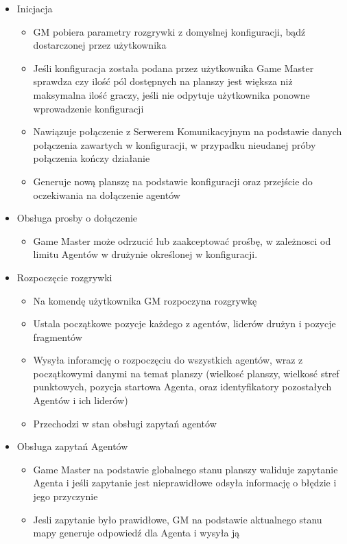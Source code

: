 \documentclass[../Dokumentacja.tex]{subfiles}
\begin{document}
\begin{itemize}
	\item Inicjacja
	\begin{itemize}
		\item GM pobiera parametry rozgrywki z domyslnej konfiguracji, bądź dostarczonej przez użytkownika
		\item Jeśli konfiguracja została podana przez użytkownika Game Master sprawdza czy ilość pól dostępnych na planszy jest większa niż maksymalna ilość graczy, jeśli nie odpytuje użytkownika ponowne wprowadzenie konfiguracji
		\item Nawiązuje połączenie z Serwerem Komunikacyjnym na podstawie danych połączenia zawartych w konfiguracji, w przypadku nieudanej próby połączenia kończy działanie
		\item Generuje nową planszę na podstawie konfiguracji oraz przejście do oczekiwania na dołączenie agentów
	\end{itemize}
	\item Obsługa prosby o dołączenie
	\begin{itemize}
		\item Game Master może odrzucić lub zaakceptować prośbę, w zależnosci od limitu Agentów w drużynie określonej w konfiguracji.
	\end{itemize}
		\item Rozpoczęcie rozgrywki
	\begin{itemize}
		\item Na komendę użytkownika GM rozpoczyna rozgrywkę
		\item Ustala początkowe pozycje każdego z agentów, liderów drużyn i pozycje fragmentów
		\item Wysyła inforamcję o rozpoczęciu do wszystkich agentów, wraz z początkowymi danymi na temat planszy (wielkosć planszy, wielkosć stref punktowych, pozycja startowa Agenta, oraz identyfikatory pozostałych Agentów i ich liderów)
		\item Przechodzi w stan obsługi zapytań agentów
	\end{itemize}
	\item Obsługa zapytań Agentów
	\begin{itemize}
		\item Game Master na podstawie globalnego stanu planszy waliduje zapytanie Agenta i jeśli zapytanie jest nieprawidłowe odsyła informację o błędzie i jego przyczynie
		\item Jesli zapytanie było prawidłowe, GM na podstawie aktualnego stanu mapy generuje odpowiedź dla Agenta i wysyła ją

\end{itemize}
\end{itemize}
\end{document}
